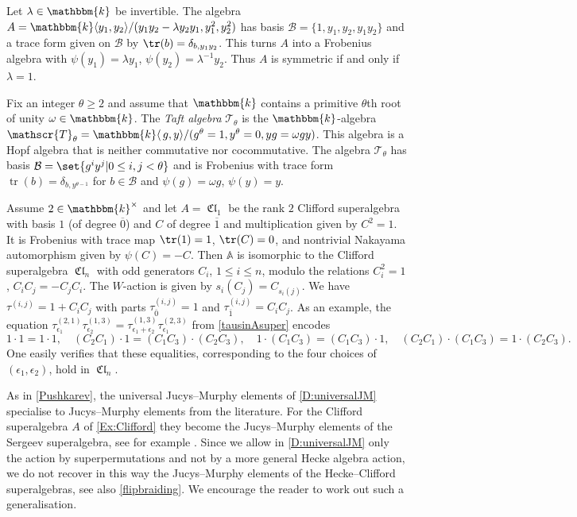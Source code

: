 \documentclass[a4paper,11pt]{amsart}
\let\<\langle
\let\>\rangle
\let\ov\overline
\newcommand\cB{\mathcal{B}}
\numberwithin{equation}{subsection}
\theoremstyle{definition}
\theoremstyle{theorem}
\theoremstyle{remark}
\DeclareMathOperator\Cl{\mathfrak{Cl}}
\newcommand\Sym{W}
\newcommand{\epso}{{\epsilon_1}}
\newcommand{\epsoo}{{\epsilon_2}}
\newcommand\Taft[1][\theta]{\mathscr{T}_{#1}}
\newcommand\op{\operatorname}
\newcommand\kk{\mathbbm{k}}
\newcommand{\Ao}{\mathbb{A}}
\begin{document}
  \begin{Example}\label{Alambda}Let $\lambda\in\kk$ be invertible. The algebra $A=\kk\langle y_1,y_2\rangle/(y_1y_2-\lambda y_2y_1, y_1^2,y_2^2)$  has basis $\cB=\{1,y_1,y_2,y_1y_2\} $ and a
  trace form given on $\cB$ by $\tr(b)=\delta_{b,y_1y_2}$. This turns
  $A$ into a Frobenius algebra with
  $\psi(y_1)=\lambda y_1$, $\psi(y_2)=\lambda^{-1} y_2$. Thus $A$ is
  symmetric if and only if $\lambda=1$.
\end{Example}
 \begin{Example}\label{Ex:Taft}
    Fix an integer $\theta\ge2$ and assume that $\kk$ contains a
     primitive $\theta$th root of unity $\omega\in\kk$. The \emph{Taft
     algebra} $\Taft$ is the $\kk$-algebra
     $\Taft=\kk\<\,g,y\>/( g^\theta=1, y^\theta=0, yg=\omega gy)$. This
     algebra is a Hopf algebra that is neither commutative nor
     cocommutative. The algebra $\Taft$ has basis $\cB=\set{g^iy^j| 0\leq i,j<\theta}$ and is
     Frobenius with trace form $\op{tr}(b)=\delta_{b,y^{\theta-1}}$ for $b\in \cB$ and $\psi(g)=\omega g$, $\psi(y)=y$.
     \end{Example}
    \begin{Example}\label{Ex:Clifford}
    Assume $2\in\kk^\times$ and let $A=\Cl_1$ be the rank $2$ Clifford superalgebra with basis $1$ (of degree $\ov0$) and $C$ of degree $\ov 1$ and multiplication given by $C^2=1$. It is Frobenius with trace map $\tr(1)=1$, $\tr(C)=0$, and nontrivial Nakayama automorphism given by $\psi(C)=-C$. Then $\Ao$ is isomorphic to the Clifford superalgebra $\Cl_n$ with odd generators $C_i$, $1\le i\le n$, modulo the relations $C_i^2=1$, $C_iC_j=-C_jC_i$. The $\Sym$-action is given by $s_i(C_j)=C_{s_i(j)}$. We have $\tau^{(i,j)}=1+ C_iC_j$ with parts $\tau^{(i,j)}_{\ov{0}}=1$ and $\tau^{(i,j)}_{\ov{1}}=C_iC_j$.
As an example, the equation  $\tau_{\epso}^{(2,1)}\tau_{\epsoo}^{(1,3)}=\tau^{(1,3)}_{\epso+\epsoo}\tau^{(2,3)}_{\epso}$ from \autoref{tausinAsuper} encodes
\[1\cdot1=1\cdot1, \quad (C_2C_1)\cdot1=(C_1C_3)\cdot(C_2C_3),  \quad 1\cdot (C_1C_3)=(C_1C_3)\cdot 1,  \quad (C_2C_1)\cdot(C_1C_3)=1\cdot (C_2C_3).\]
One easily verifies that these equalities, corresponding to the four choices of $(\epso,\epsoo)$,  hold in $\Cl_n$.
   \end{Example}

   \begin{Remark}\label{RkJM}
As in \autoref{Pushkarev}, the universal Jucys--Murphy elements of
\autoref{D:universalJM} specialise to Jucys--Murphy elements from the literature. For the Clifford
superalgebra $A$ of \autoref{Ex:Clifford} they become the Jucys--Murphy elements of the Sergeev
superalgebra, see for example \cite[(13.6)]{Kleshchevbook}. Since we allow in
\autoref{D:universalJM} only the action by superpermutations and not by a more general Hecke
algebra action, we do not recover in this way the Jucys--Murphy elements of the Hecke--Clifford
superalgebras, see also \autoref{flipbraiding}. We encourage the reader to work out such a generalisation.
\end{Remark}
\end{document}
